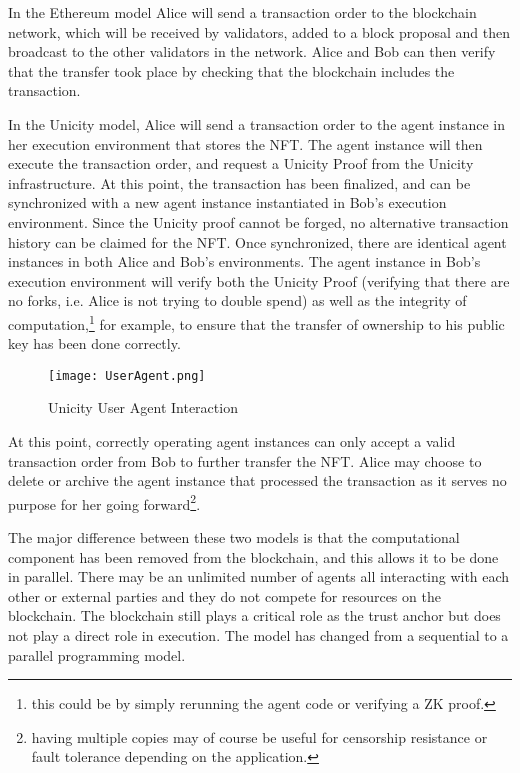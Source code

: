 \documentclass{article}
\begin{document}
In the Ethereum model Alice will send a transaction order to the blockchain network, which will be received by validators, added to a block proposal and then broadcast to the other validators in the network. Alice and Bob can then verify that the transfer took place by checking that the blockchain includes the transaction.
\vspace{2mm}

In the Unicity model, Alice will send a transaction order to the agent instance in her execution environment that stores the NFT. The agent instance will then execute the transaction order, and request a Unicity Proof from the Unicity infrastructure.  At this point, the transaction has been finalized, and can be synchronized with a new agent instance instantiated in Bob's execution environment. Since the Unicity proof cannot be forged, no alternative transaction history can be claimed for the NFT.  Once synchronized, there are identical agent instances in both Alice and Bob's environments. The agent instance in Bob's execution environment will verify both the Unicity Proof (verifying that there are no forks, i.e. Alice is not trying to double spend) as well as the integrity of computation,\footnote{this could be by simply rerunning the agent code or verifying a ZK proof.} for example, to ensure that the transfer of ownership to his public key has been done correctly.

\begin{figure}[htbp]
    \centering
    \texttt{[image: UserAgent.png]}
    \caption{Unicity User Agent Interaction}
    \label{fig:UserAgent}
\end{figure}

At this point, correctly operating agent instances can only accept a valid transaction order from Bob to further transfer the NFT. Alice may choose to delete or archive the agent instance that processed the transaction as it serves no purpose for her going forward\footnote{having multiple copies may of course be useful for censorship resistance or fault tolerance depending on the application.}. 

\vspace{2mm}

The major difference between these two models is that the computational component has been removed from the blockchain, and this allows it to be done in parallel. There may be an unlimited number of agents all interacting with each other or external parties and they do not compete for resources on the blockchain. The blockchain still plays a critical role as the trust anchor but does not play a direct role in execution. The model has changed from a sequential to a parallel programming model.
\vspace{2mm}
\end{document}
